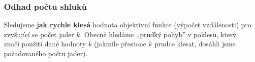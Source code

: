 \subsubsection{Odhad počtu shluků}
Sledujeme \textbf{jak rychle klesá} hodnota objektivní funkce (výpočet vzdálenosti) pro zvyšující se počet jader $ k $. Obecně hledáme ,,prudký pohyb'' v poklesu, který značí použití dané hodnoty $k$ (jakmile přestane $k$ prudce klesat, dosáhli jsme požadovaného počtu jader).